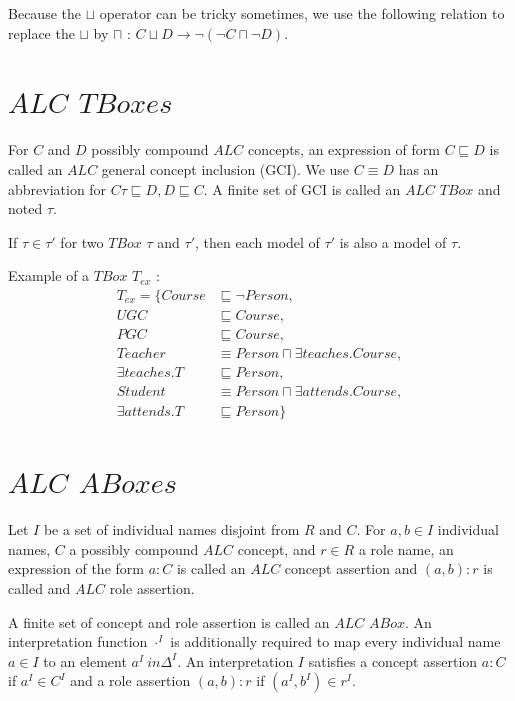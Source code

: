 \documentclass[a4paper,11pt]{report}
\begin{document}
Because the $\sqcup$ operator can be tricky sometimes, we use the following relation to replace the $\sqcup$ by $\sqcap$ : $C \sqcup D \rightarrow \neg(\neg C \sqcap \neg D)$.

\section*{$ALC$ $TBoxes$}

For $C$ and $D$ possibly compound $ALC$ concepts, an expression of form $C \sqsubseteq D$ is called an $ALC$ general concept inclusion (GCI). We use $C \equiv D$ has an abbreviation for $ C\tau \sqsubseteq D, D \sqsubseteq C$. A finite set of GCI is called an $ALC$ $TBox$ and noted $\tau$.

\begin{Lemma}
If $\tau \in \tau'$ for two $TBox$ $\tau$ and $\tau'$, then each model of $\tau'$ is also a model of $\tau$. 
\end{Lemma}

Example of a $TBox$ $T_{ex}$ :
\begin{align*}
T_{ex} = \{ Course &\sqsubseteq \neg Person,\\
UGC &\sqsubseteq Course,\\
PGC &\sqsubseteq Course,\\
Teacher &\equiv Person \sqcap \exists teaches.Course,\\
\exists teaches.T &\sqsubseteq Person,\\
Student &\equiv Person \sqcap \exists attends.Course ,\\
\exists attends.T &\sqsubseteq Person \}
\end{align*}

\section*{$ALC$ $ABoxes$}

Let $I$ be a set of individual names disjoint from $R$ and $C$. For $a,b \in I$ individual names, $C$ a possibly compound $ALC$ concept, and $r \in R$ a role name, an expression of the form $a:C$ is called an $ALC$ concept assertion and $(a,b) : r$ is called and $ALC$ role assertion.

A finite set of concept and role assertion is called an $ALC$ $ABox$. An interpretation function $\cdot^I$ is additionally required to map every individual name $a\in I$ to an element $a^I \ in \Delta^I$. An interpretation $I$ satisfies a concept assertion $a:C$ if $a^I \in C^I$ and a role assertion $(a,b):r$ if $(a^I,b^I) \in r^I$.
\end{document}
